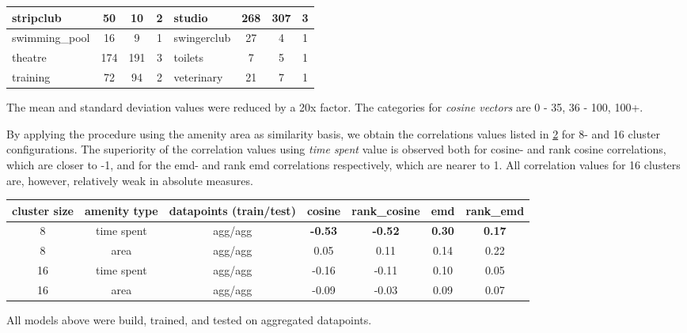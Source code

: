 \begin{table}[!ht]
{\begin{tabular}{ | l | c | c | c || l | c | c | c |}
				stripclub & 50 & 10 & 2 & studio & 268 & 307 & 3 \\ \hline
				swimming\_pool & 16 & 9 & 1 & swingerclub & 27 & 4 & 1 \\ \hline
				theatre & 174 & 191 & 3 & toilets & 7 & 5 & 1 \\ \hline
				training & 72 & 94 & 2 & veterinary & 21 & 7 & 1 \\ \hline
		\end{tabular}}
		\label{tab:amenity_area_values}
		\begin{tabnote}
			The mean and standard deviation values were reduced by a 20x factor. The categories for \textit{cosine vectors} are 0 - 35, 36 - 100, 100+.
		\end{tabnote}
	\end{table}
	
	By applying the procedure using the amenity area as similarity basis, we obtain the correlations values listed in \cref{tab:correlation_amenity_area} for 8- and 16 cluster configurations. The superiority of the correlation values using \textit{time spent} value is observed both for cosine- and rank cosine correlations, which are closer to -1, and for the emd- and rank emd correlations respectively, which are nearer to 1. All correlation values for 16 clusters are, however, relatively weak in absolute measures.
	
	\begin{table}[!ht]
		{\begin{tabular}{ | c | c | c | c | c | c | c | }
				\hline
				{cluster size} 	& {amenity type} 	& datapoints (train/test) 	& cosine 	& rank\_cosine & emd & rank\_emd \\ \hline
				8 				& {time spent} 		& agg/agg 		& \textbf{-0.53}	& \textbf{-0.52}		&	\textbf{0.30}	&	\textbf{0.17} \\ \hline
				8 				& area 				& agg/agg 		& 0.05	&	0.11	&	0.14	&	0.22 \\ \hline \hline
				16 				& {time spent} 		& agg/agg 		& -0.16	&	-0.11	&	0.10	&	0.05 \\ \hline
				16 				& area 				& agg/agg 		& -0.09	&	-0.03	&	0.09	&	0.07 \\ \hline
		\end{tabular}}
		\begin{tabnote}
			All models above were build, trained, and tested on aggregated datapoints.  
		\end{tabnote}
		\label{tab:correlation_amenity_area}
	\end{table}
							
